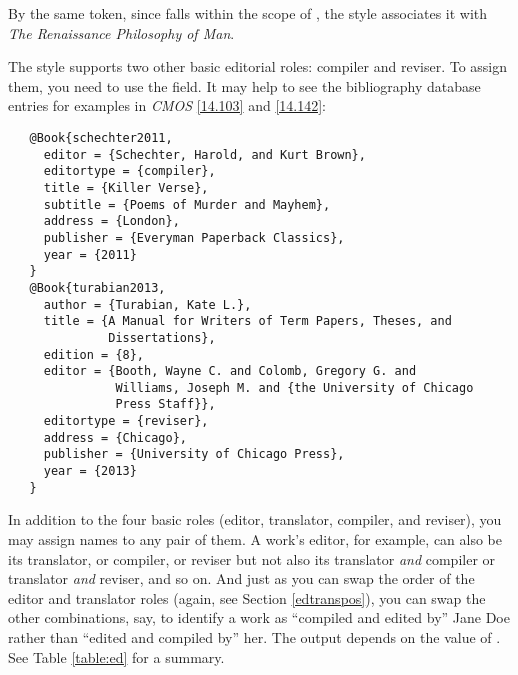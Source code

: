 \documentclass[11pt,letterpaper,oneside]{article}
\begin{document}
\noindent By the same token, since  falls within the
scope of , the style associates it with
\textit{The Renaissance Philosophy of Man}.

The style supports two other basic editorial roles: compiler and
reviser. To assign them, you need to use the 
field. It may help to see the bibliography database entries for
examples in \textit{CMOS} \ref{14.103} and \ref{14.142}:

\begin{verbatim}
   @Book{schechter2011,
     editor = {Schechter, Harold, and Kurt Brown},
     editortype = {compiler},
     title = {Killer Verse},
     subtitle = {Poems of Murder and Mayhem},
     address = {London},
     publisher = {Everyman Paperback Classics},
     year = {2011}
   }
   @Book{turabian2013,
     author = {Turabian, Kate L.},
     title = {A Manual for Writers of Term Papers, Theses, and
              Dissertations},
     edition = {8},
     editor = {Booth, Wayne C. and Colomb, Gregory G. and
               Williams, Joseph M. and {the University of Chicago
               Press Staff}},
     editortype = {reviser},
     address = {Chicago},
     publisher = {University of Chicago Press},
     year = {2013}
   }
\end{verbatim}

\begin{citebib}
\item \cite{schechter2011}
\item \cite{turabian2013}
\end{citebib}

In addition to the four basic roles (editor, translator, compiler, and
reviser), you may assign names to any pair of them. A work's editor,
for example, can also be its translator, or compiler, or reviser but
not also its translator \textit{and} compiler or translator
\textit{and} reviser, and so on. And just as you can swap the order of
the editor and translator roles (again, see Section \ref{edtranspos}),
you can swap the other combinations, say, to identify a work as
``compiled and edited by'' Jane Doe rather than ``edited and compiled
by'' her. The output depends on the value of .
See Table \ref{table:ed} for a summary.
\end{document}
